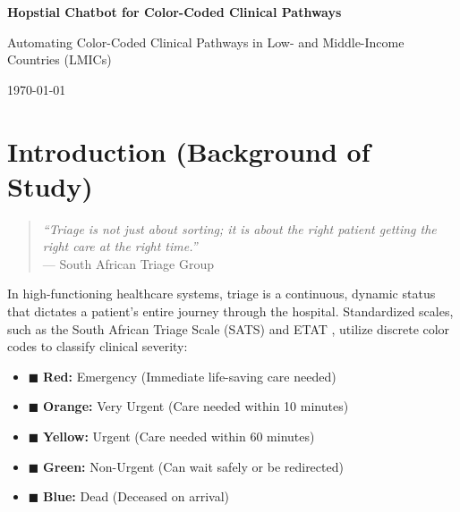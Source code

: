 \documentclass[12pt, a4paper]{article}
\begin{document}
	
	\begin{titlepage}
		\centering
		\vspace*{4cm}
		
		{\Huge \textbf{Hopstial Chatbot for Color-Coded Clinical Pathways} \par}
		\vspace{2cm}
		
		{\Large \textbf{} \par}
		\vspace{0.5cm}
		{\Large Automating Color-Coded Clinical Pathways in Low- and Middle-Income Countries (LMICs) \par}
		
		\vspace{4cm}
		
		{\large \today \par}
		
		\vfill
	\end{titlepage}
	
	\tableofcontents
	\newpage
	
	\section{Introduction (Background of Study)}
	\begin{quote}
		\textit{``Triage is not just about sorting; it is about the right patient getting the right care at the right time.''} \\
		--- South African Triage Group
	\end{quote}
	
	In high-functioning healthcare systems, triage is a continuous, dynamic status that dictates a patient's entire journey through the hospital. Standardized scales, such as the South African Triage Scale (SATS) \cite{rominski2014} and ETAT \cite{kamau2024}, utilize discrete color codes to classify clinical severity:
	\begin{itemize}
		\item \textcolor{triageRed}{$\blacksquare$} \textbf{Red:} Emergency (Immediate life-saving care needed)
		\item \textcolor{triageOrange}{$\blacksquare$} \textbf{Orange:} Very Urgent (Care needed within 10 minutes)
		\item \textcolor{triageYellow}{$\blacksquare$} \textbf{Yellow:} Urgent (Care needed within 60 minutes)
		\item \textcolor{triageGreen}{$\blacksquare$} \textbf{Green:} Non-Urgent (Can wait safely or be redirected)
		\item \textcolor{triageBlue}{$\blacksquare$} \textbf{Blue:} Dead (Deceased on arrival)
	\end{itemize}
	
\end{document}

